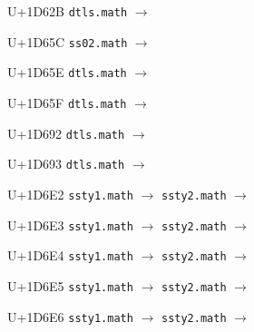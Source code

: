 \documentclass{article}
\begin{document}
\begin{substitutions}
\goodbreak

U+1D62B  \linebreak
    \texttt{dtls.math} $\to$  

\goodbreak

U+1D65C  \linebreak
    \texttt{ss02.math} $\to$  

\goodbreak

U+1D65E  \linebreak
    \texttt{dtls.math} $\to$  

\goodbreak

U+1D65F  \linebreak
    \texttt{dtls.math} $\to$  

\goodbreak

U+1D692  \linebreak
    \texttt{dtls.math} $\to$  

\goodbreak

U+1D693  \linebreak
    \texttt{dtls.math} $\to$  

\goodbreak

U+1D6E2  \linebreak
    \texttt{ssty1.math} $\to$  \linebreak
    \texttt{ssty2.math} $\to$  

\goodbreak

U+1D6E3  \linebreak
    \texttt{ssty1.math} $\to$  \linebreak
    \texttt{ssty2.math} $\to$  

\goodbreak

U+1D6E4  \linebreak
    \texttt{ssty1.math} $\to$  \linebreak
    \texttt{ssty2.math} $\to$  

\goodbreak

U+1D6E5  \linebreak
    \texttt{ssty1.math} $\to$  \linebreak
    \texttt{ssty2.math} $\to$  

\goodbreak

U+1D6E6  \linebreak
    \texttt{ssty1.math} $\to$  \linebreak
    \texttt{ssty2.math} $\to$  


\end{substitutions}
\end{document}

